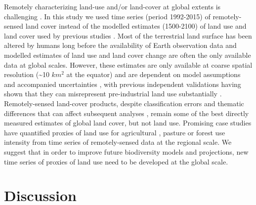 Remotely characterizing land-use and/or land-cover at global extents is challenging \citep{VERBURG2011,Kuemmerle2013}. In this study we used time series (period 1992-2015) of remotely-sensed land cover instead of the modelled estimates (1500-2100) of land use and land cover \citep{Hurtt2011,KleinGoldewijk2016} used by previous studies \citep{Newbold2015,Newbold2016,DePalma2017}. Most of the terrestrial land surface has been altered by humans long before the availability of Earth observation data \citep{Ellis2010} and modelled estimates of land use and land cover change are often the only available data at global scales. However, these estimates are only available at coarse spatial resolution (\textasciitilde 10 $km^2$ at the equator) and are dependent on model assumptions and accompanied uncertainties \citep{Gaillard2010,KleinGoldewijk2013}, with previous independent validations having shown that they can misrepresent pre-industrial land use substantially \citep{Kaplan2017}. Remotely-sensed land-cover products, despite classification errors and thematic differences that can affect subsequent analyses \citep{Sexton2015,Estes2018}, remain some of the best directly measured estimates of global land cover, but not land use. Promising case studies have quantified proxies of land use for agricultural \citep{Estel2015}, pasture \citep{Rufin2015} or forest use intensity \citep{Pflugmacher2012} from time series of remotely-sensed data at the regional scale. We suggest that in order to improve future biodiversity models and projections, new time series of proxies of land use need to be developed at the global scale. 

\section{Discussion}
\label{C04_05}

